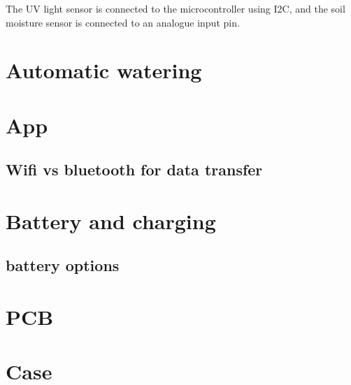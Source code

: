 The UV light sensor is connected to the microcontroller using I2C, and the soil moisture sensor is connected to an analogue input pin.

\section{Automatic watering}

\section{App}
\subsection{Wifi vs bluetooth for data transfer}

\section{Battery and charging}
\label{sec:battery}
\subsection{battery options}

\section{PCB}

\section{Case}
